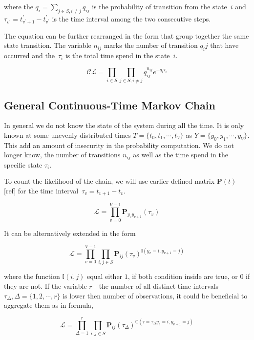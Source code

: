 \documentclass[thesis=M,english]{FITthesis}[2012/10/20]
\newcommand{\matr}[1]{\mathbf{#1}}
\begin{document}
where the $q_i = \sum_{j\in S, i\neq j} q_{ij}$ is the probability of transition from the state~$i$ and   
$\tau_{v^{'}} = t_{v^{'}+1}^{'} - t_{v^{'}}^{'}$ is the time interval among the two consecutive steps.

The equation can be further rearranged in the form that group together the same state transition. The variable $n_{ij}$ marks the number of transition $q_ij$ that have occurred and the~$\tau_i$ is the total time spend in the state~$i$.

\begin{equation}\label{eq:CL2}
 \mathcal{CL} = \prod_{i \in S} \prod_{j \in S, i \neq j} q_{ij}^{n_{ij} } e^{ - q_i \tau_i }
\end{equation}

\subsection{ General Continuous-Time Markov Chain }

In general we do not know the state of the system during all the time. It is only known at some unevenly distributed times $T = \{ t_0, t_1, \cdots, t_{V} \}$ as $Y= \{y_0, y_1, \cdots, y_{V} \}$. 
This add an amount of insecurity in the probability computation. We do not longer know, the number of transitions $n_{ij}$ as well as the time spend in the specific state $\tau_i$. 

To count the likelihood of the chain, we will use earlier defined matrix $\matr{P}(t)$ [ref] for the time interval~$\tau_v = t_{v+1} - t_v$.    

\begin{equation}
 \mathcal{L} = \prod_{v=0}^{V-1} \matr{P}_{y_v y_{v+1}}(\tau_v) 
\end{equation}

It can be alternatively extended in the form

\begin{equation}
 \mathcal{L} = \prod_{v=0}^{V-1} \prod_{i,j \in S}  \matr{P}_{ij}(\tau_v)^{\mathbb{I}( y_v = i, y_{v+1} = j )} 
\end{equation}

where the function $\mathbb{I}(i,j)$ equal either $1$, if both condition inside are true, or $0$ if they are not. 
If the variable $r$ - the number of all distinct time intervals $\tau_{\Delta}, \Delta =\{1,2,\cdots,r\}$ is lower then number of observations, it could be beneficial to aggregate them as in formula,

\begin{equation}\label{eq:CTL}
 \mathcal{L} = \prod_{\Delta = 1}^{r} \prod_{i,j \in S}  \matr{P}_{ij}(\tau_{\Delta})^{\mathbb{C}( \tau=\tau_{\Delta} y_v = i, y_{v+1} = j )} 
\end{equation}
\end{document}
